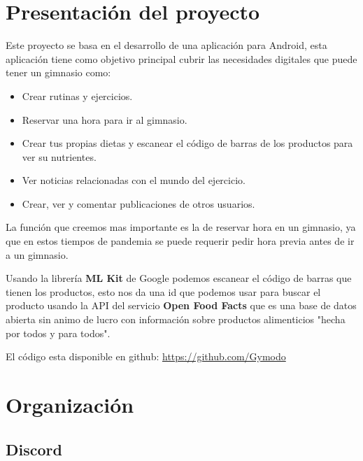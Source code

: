 \documentclass[12pt,a4paper]{article}
\begin{document}
\newpage

\tableofcontents

\newpage

\section{Presentación del proyecto}
Este proyecto se basa en el desarrollo de una aplicación para Android, esta aplicación tiene como objetivo principal cubrir las necesidades digitales que puede tener un gimnasio como:

\begin{itemize}
\item Crear rutinas y ejercicios.
\item Reservar una hora para ir al gimnasio.
\item Crear tus propias dietas y escanear el código de barras de los productos para ver su nutrientes.
\item Ver noticias relacionadas con el mundo del ejercicio.
\item Crear, ver y comentar publicaciones de otros usuarios.
\end{itemize}

La función que creemos mas importante es la de reservar hora en un gimnasio, ya que en estos tiempos de pandemia se puede requerir pedir hora previa antes de ir a un gimnasio.

Usando la librería \textbf{ML Kit} de Google podemos escanear el código de barras que tienen los productos, esto nos da una id que podemos usar para buscar el producto usando la API del servicio \textbf{Open Food Facts} que es una base de datos abierta sin animo de lucro con información sobre productos alimenticios "hecha por todos y para todos".


El código esta disponible en github: \href{https://github.com/Gymodo}{https://github.com/Gymodo}

\newpage

\section{Organización}

\subsection{Discord}
\end{document}
